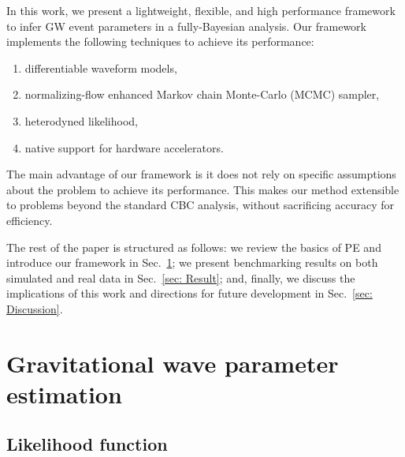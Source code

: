\documentclass[twocolumn]{aastex631}
\begin{document}

In this work, we present a lightweight, flexible, and high performance
framework to infer GW event parameters in a fully-Bayesian analysis. Our
framework implements the following techniques to achieve its performance:
\begin{enumerate}
\setlength{\itemsep}{0pt}
\item differentiable waveform models,
\item normalizing-flow enhanced Markov chain Monte-Carlo (MCMC) sampler,
\item heterodyned likelihood,
\item native support for hardware accelerators.
\end{enumerate}
The main advantage of our framework is it does not rely on specific assumptions
about the problem to achieve its performance. This makes our method extensible
to problems beyond the standard CBC analysis, without sacrificing accuracy for
efficiency.


The rest of the paper is structured as follows: we review the basics of PE and
introduce our framework in Sec.~\ref{sec: PE}; we present benchmarking results
on both simulated and real data in Sec.~\ref{sec: Result}; and, finally, we
discuss the implications of this work and directions for future development in
Sec.~\ref{sec: Discussion}.

\section{Gravitational wave parameter estimation}
\label{sec: PE}

\subsection{Likelihood function}
\label{sec:likelihood}
\end{document}
